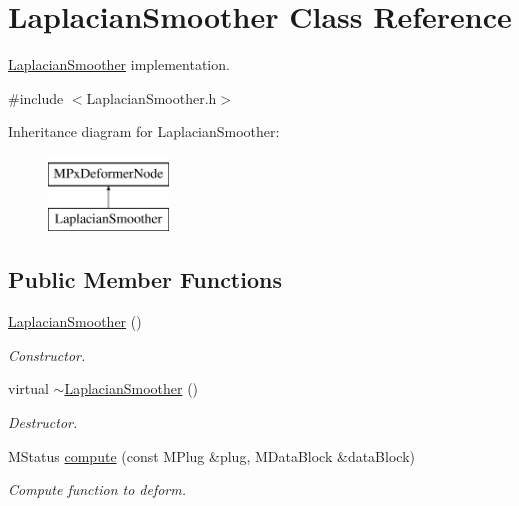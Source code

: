 \hypertarget{class_laplacian_smoother}{\section{Laplacian\+Smoother Class Reference}
\label{class_laplacian_smoother}
}


\hyperlink{class_laplacian_smoother}{Laplacian\+Smoother} implementation.  




{\ttfamily \#include $<$Laplacian\+Smoother.\+h$>$}

Inheritance diagram for Laplacian\+Smoother\+:\begin{figure}[H]
\begin{center}
\leavevmode
\includegraphics[height=2.000000cm]{class_laplacian_smoother}
\end{center}
\end{figure}
\subsection*{Public Member Functions}
\begin{DoxyCompactItemize}
\item 
\hypertarget{class_laplacian_smoother_abf02c86745e5c99a043ec0ac4974e5d5}{\hyperlink{class_laplacian_smoother_abf02c86745e5c99a043ec0ac4974e5d5}{Laplacian\+Smoother} ()}\label{class_laplacian_smoother_abf02c86745e5c99a043ec0ac4974e5d5}

\begin{DoxyCompactList}\small\item\em Constructor. \end{DoxyCompactList}\item 
\hypertarget{class_laplacian_smoother_ac7c1d554540a1168f7e2d76e003dadfb}{virtual \hyperlink{class_laplacian_smoother_ac7c1d554540a1168f7e2d76e003dadfb}{$\sim$\+Laplacian\+Smoother} ()}\label{class_laplacian_smoother_ac7c1d554540a1168f7e2d76e003dadfb}

\begin{DoxyCompactList}\small\item\em Destructor. \end{DoxyCompactList}\item 
M\+Status \hyperlink{class_laplacian_smoother_aa7c21d1acfef33eefbd020c959fa1eb0}{compute} (const M\+Plug \&plug, M\+Data\+Block \&data\+Block)
\begin{DoxyCompactList}\small\item\em Compute function to deform. \end{DoxyCompactList}\end{DoxyCompactItemize}
